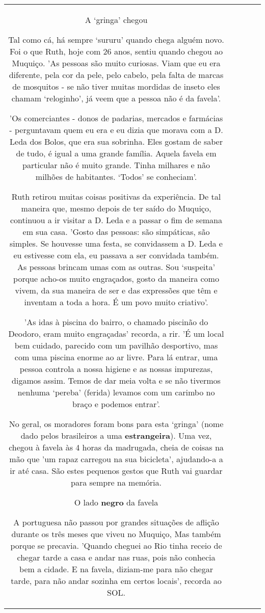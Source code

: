 \documentclass[11pt]{article}
\newlength\mylength
\begin{document}
\begin{center}
\begin{longtable}{|C{.65\mylength}|C{.30\mylength}|C{.12\mylength}|C{.12\mylength}|C{.12\mylength}|}
A ‘gringa' chegou

Tal como cá, há sempre ‘sururu' quando chega alguém novo. Foi o que Ruth, hoje com 26 anos, sentiu quando chegou ao Muquiço. 'As pessoas são muito curiosas. Viam que eu era diferente, pela cor da pele, pelo cabelo, pela falta de marcas de mosquitos - se não tiver muitas mordidas de inseto eles chamam ‘reloginho', já veem que a pessoa não é da favela'. 

'Os comerciantes - donos de padarias, mercados e farmácias - perguntavam quem eu era e eu dizia que morava com a D. Leda dos Bolos, que era sua sobrinha. Eles gostam de saber de tudo, é igual a uma grande família. Aquela favela em particular não é muito grande. Tinha milhares e não milhões de habitantes. ‘Todos' se conheciam'.

Ruth retirou muitas coisas positivas da experiência. De tal maneira que, mesmo depois de ter saído do Muquiço, continuou a ir visitar a D. Leda e a passar o fim de semana em sua casa. 'Gosto das pessoas: são simpáticas, são simples. Se houvesse uma festa, se convidassem a D. Leda e eu estivesse com ela, eu passava a ser convidada também. As pessoas brincam umas com as outras. Sou ‘suspeita' porque acho-os muito engraçados, gosto da maneira como vivem, da sua maneira de ser e das expressões que têm e inventam a toda a hora. É um povo muito criativo'.

'As idas à piscina do bairro, o chamado piscinão do Deodoro, eram muito engraçadas' recorda, a rir. 'É um local bem cuidado, parecido com um pavilhão desportivo, mas com uma piscina enorme ao ar livre. Para lá entrar, uma pessoa controla a nossa higiene e as nossas impurezas, digamos assim. Temos de dar meia volta e se não tivermos nenhuma ‘pereba' (ferida) levamos com um carimbo no braço e podemos entrar'. 

No geral, os moradores foram bons para esta ‘gringa' (nome dado pelos brasileiros a uma \textbf{estrangeira}). Uma vez, chegou à favela às 4 horas da madrugada, cheia de coisas na mão que 'um rapaz carregou na sua bicicleta', ajudando-a a ir até casa. São estes pequenos gestos que Ruth vai guardar para sempre na memória.

O lado \textbf{negro} da favela

A portuguesa não passou por grandes situações de aflição durante os três meses que viveu no Muquiço, Mas também porque se precavia. 'Quando cheguei ao Rio tinha receio de chegar tarde a casa e andar nas ruas, pois não conhecia bem a cidade. E na favela, diziam-me para não chegar tarde, para não andar sozinha em certos locais', recorda ao SOL.


\end{longtable}
\end{center}
\end{document}
